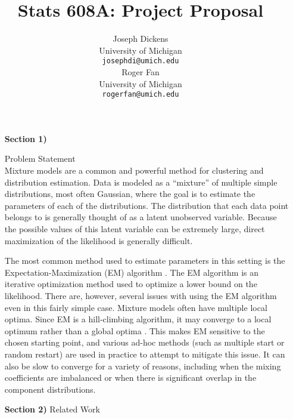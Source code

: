 \documentclass{article}
\theoremstyle{definition}
\begin{document}
\title{Stats 608A: Project Proposal}
\author{
  Joseph Dickens \\
  University of Michigan \\
  \texttt{josephdi@umich.edu} \\
\And
  Roger Fan \\
  University of Michigan\\
  \texttt{rogerfan@umich.edu} \\
}

\maketitle

\begin{itemize}

  \item[\textbf{Section 1)}] {Problem Statement\\

  Mixture models are a common and powerful method for clustering and distribution estimation. Data is modeled as a ``mixture'' of multiple simple distributions, most often Gaussian, where the goal is to estimate the parameters of each of the distributions. The distribution that each data point belongs to is generally thought of as a latent unobserved variable. Because the possible values of this latent variable can be extremely large, direct maximization of the likelihood is generally difficult.

  The most common method used to estimate parameters in this setting is the Expectation-Maximization (EM) algorithm \cite{dempsterlairdrubin77}. The EM algorithm is an iterative optimization method used to optimize a lower bound on the likelihood. There are, however, several issues with using the EM algorithm even in this fairly simple case. Mixture models often have multiple local optima. Since EM is a hill-climbing algorithm, it may converge to a local optimum rather than a global optima \cite{wu83}. This makes EM sensitive to the chosen starting point, and various ad-hoc methods (such as multiple start or random restart) are used in practice to attempt to mitigate this issue. It can also be slow to converge for a variety of reasons, including when the mixing coefficients are imbalanced or when there is significant overlap in the component distributions.

  }
  
\vspace{1cm}
  
  \item[\textbf{Section 2)}] {Related Work\\

}
\end{itemize}
\end{document}
